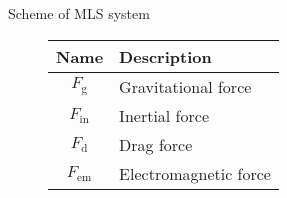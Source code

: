 \begin{frame}{Scheme of MLS system}
\begin{figure}[H]
\begin{minipage}{0.55\textwidth}
\begin{table}
                \begin{tabular}{|c|l|}
                    \hline
                    \textbf{Name}   & \textbf{Description}  \\
                    \hline
                    $F_{\text{g}}$  & Gravitational force   \\
                    $F_{\text{in}}$ & Inertial force        \\
                    $F_{\text{d}}$  & Drag force            \\
                    $F_{\text{em}}$ & Electromagnetic force \\
                    \hline
                \end{tabular}

            \end{table}

        \end{minipage}

        \label{fig:MLS_scheme}

    \end{figure}

\end{frame}



